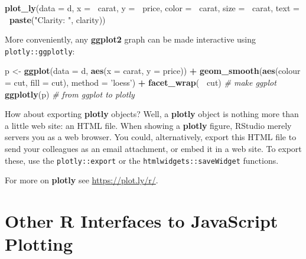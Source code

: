\documentclass[]{book}
\newenvironment{Shaded}{\begin{snugshade}}{\end{snugshade}}
\newcommand{\CommentTok}[1]{\textcolor[rgb]{0.56,0.35,0.01}{\textit{#1}}}
\newcommand{\DataTypeTok}[1]{\textcolor[rgb]{0.13,0.29,0.53}{#1}}
\newcommand{\KeywordTok}[1]{\textcolor[rgb]{0.13,0.29,0.53}{\textbf{#1}}}
\newcommand{\NormalTok}[1]{#1}
\newcommand{\OperatorTok}[1]{\textcolor[rgb]{0.81,0.36,0.00}{\textbf{#1}}}
\newcommand{\StringTok}[1]{\textcolor[rgb]{0.31,0.60,0.02}{#1}}
\theoremstyle{definition}
\theoremstyle{definition}
\theoremstyle{definition}
\theoremstyle{remark}
\begin{document}
\begin{Shaded}
\begin{Highlighting}[]
\KeywordTok{plot_ly}\NormalTok{(}\DataTypeTok{data =}\NormalTok{ d, }\DataTypeTok{x =} \OperatorTok{~}\NormalTok{carat, }\DataTypeTok{y =} \OperatorTok{~}\NormalTok{price, }\DataTypeTok{color =} \OperatorTok{~}\NormalTok{carat, }\DataTypeTok{size =} \OperatorTok{~}\NormalTok{carat, }\DataTypeTok{text =} \OperatorTok{~}\KeywordTok{paste}\NormalTok{(}\StringTok{"Clarity: "}\NormalTok{, clarity))}
\end{Highlighting}
\end{Shaded}

More conveniently, any \textbf{ggplot2} graph can be made interactive using \texttt{plotly::ggplotly}:

\begin{Shaded}
\begin{Highlighting}[]
\NormalTok{p <-}\StringTok{ }\KeywordTok{ggplot}\NormalTok{(}\DataTypeTok{data =}\NormalTok{ d, }\KeywordTok{aes}\NormalTok{(}\DataTypeTok{x =}\NormalTok{ carat, }\DataTypeTok{y =}\NormalTok{ price)) }\OperatorTok{+}
\StringTok{  }\KeywordTok{geom_smooth}\NormalTok{(}\KeywordTok{aes}\NormalTok{(}\DataTypeTok{colour =}\NormalTok{ cut, }\DataTypeTok{fill =}\NormalTok{ cut), }\DataTypeTok{method =} \StringTok{'loess'}\NormalTok{) }\OperatorTok{+}\StringTok{ }
\StringTok{  }\KeywordTok{facet_wrap}\NormalTok{(}\OperatorTok{~}\StringTok{ }\NormalTok{cut) }\CommentTok{# make ggplot}
\KeywordTok{ggplotly}\NormalTok{(p) }\CommentTok{# from ggplot to plotly}
\end{Highlighting}
\end{Shaded}

\hypertarget{htmlwidget-614d84b925e39db30ed1}{}

How about exporting \textbf{plotly} objects?
Well, a \textbf{plotly} object is nothing more than a little web site: an HTML file.
When showing a \textbf{plotly} figure, RStudio merely servers you as a web browser.
You could, alternatively, export this HTML file to send your colleagues as an email attachment, or embed it in a web site.
To export these, use the \texttt{plotly::export} or the \texttt{htmlwidgets::saveWidget} functions.

For more on \textbf{plotly} see \url{https://plot.ly/r/}.

\hypertarget{other-r-interfaces-to-javascript-plotting}{%
\section{Other R Interfaces to JavaScript Plotting}\label{other-r-interfaces-to-javascript-plotting}}
\end{document}
